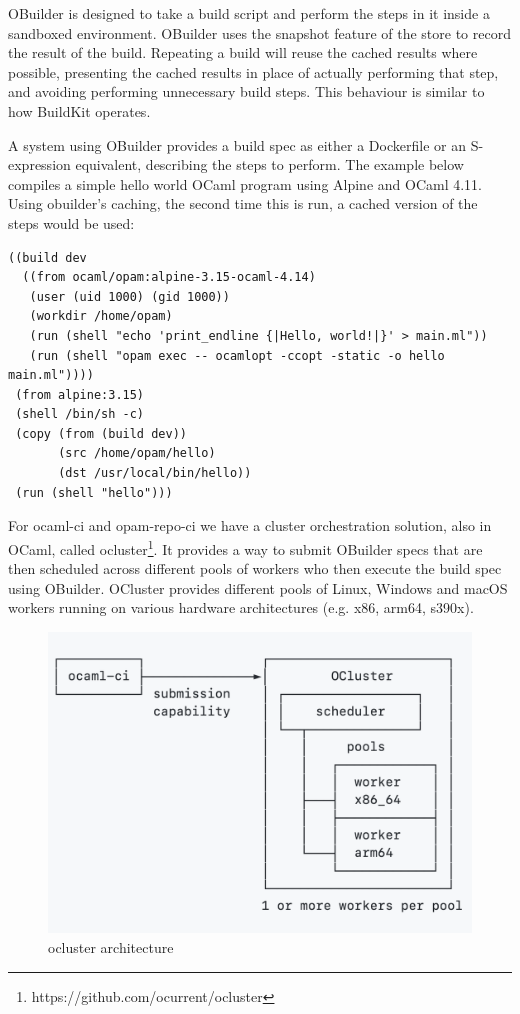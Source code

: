 \documentclass[manuscript,screen,sigplan]{acmart}
\begin{document}
OBuilder is designed to take a build script and perform the steps in it inside a sandboxed environment. OBuilder uses the snapshot feature of the store to record the result of the build. Repeating a build will reuse the cached results where possible, presenting the cached results in place of actually performing that step, and avoiding performing unnecessary build steps. This behaviour is similar to how BuildKit operates.

A system using OBuilder provides a build spec as either a Dockerfile or an S-expression equivalent, describing the steps to perform. The example below compiles a simple hello world OCaml program using Alpine and OCaml 4.11. Using obuilder's caching, the second time this is run, a cached version of the steps would be used:

\lstset{
  numbersep=5pt,language=Lisp, stringstyle=\ttfamily, basicstyle=\footnotesize, 
  showstringspaces=false
}

\begin{lstlisting}[firstnumber=1, caption=build spec, label=glabels] 
((build dev
  ((from ocaml/opam:alpine-3.15-ocaml-4.14)
   (user (uid 1000) (gid 1000))
   (workdir /home/opam)
   (run (shell "echo 'print_endline {|Hello, world!|}' > main.ml"))
   (run (shell "opam exec -- ocamlopt -ccopt -static -o hello main.ml"))))
 (from alpine:3.15)
 (shell /bin/sh -c)
 (copy (from (build dev))
       (src /home/opam/hello)
       (dst /usr/local/bin/hello))
 (run (shell "hello")))
\end{lstlisting}

For ocaml-ci and opam-repo-ci we have a cluster orchestration solution, also in OCaml, called ocluster\footnote{https://github.com/ocurrent/ocluster}. It provides a way to submit OBuilder specs that are then scheduled across different pools of workers who then execute the build spec using OBuilder. OCluster provides different pools of Linux, Windows and macOS workers running on various hardware architectures (e.g. x86, arm64, s390x). 

\begin{figure}
  \includegraphics[width=\linewidth]{ocluster-arch.png}
  \caption{ocluster architecture}
  \label{fig:arch1}
\end{figure}
\end{document}
